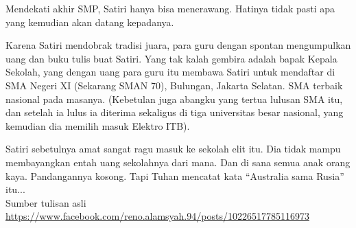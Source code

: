 Mendekati akhir SMP, Satiri hanya bisa menerawang. Hatinya tidak pasti apa yang kemudian akan datang kepadanya.

Karena Satiri mendobrak tradisi juara, para guru dengan spontan mengumpulkan uang dan buku tulis buat Satiri. Yang tak kalah gembira adalah bapak Kepala Sekolah, yang dengan uang para guru itu membawa Satiri untuk mendaftar di SMA Negeri XI (Sekarang SMAN 70), Bulungan, Jakarta Selatan. SMA terbaik nasional pada masanya. (Kebetulan juga abangku yang tertua lulusan SMA itu, dan setelah ia lulus ia diterima sekaligus di tiga universitas besar nasional, yang kemudian dia memilih masuk Elektro ITB).

Satiri sebetulnya amat sangat ragu masuk ke sekolah elit itu. Dia tidak mampu membayangkan entah uang sekolahnya dari mana. Dan di sana semua anak orang kaya. Pandangannya kosong. Tapi Tuhan mencatat kata “Australia sama Rusia” itu...
\\[10pt]

Sumber tulisan asli \url{https://www.facebook.com/reno.alamsyah.94/posts/10226517785116973}

